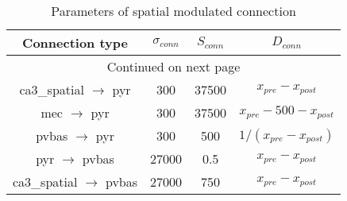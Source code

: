 \begin{longtable}{cccc}
\caption{Parameters of spatial modulated connection}\label{spat_conn}\\
\toprule
Connection type & $\sigma_{conn}$ & $S_{conn}$ & $D_{conn}$ \\
\midrule
\endhead
\midrule
\multicolumn{4}{c}{{Continued on next page}} \\
\midrule
\endfoot

\bottomrule
\endlastfoot
ca3\_spatial $\rightarrow$  pyr  & 300 &    37500 &  $x_{pre} - x_{post}$  \\
mec $\rightarrow$  pyr  &   300 &     37500        &  $x_{pre} - 500 - x_{post}$\\
pvbas $\rightarrow$ pyr &   300 &      500       &  $1/(x_{pre} - x_{post})$\\
pyr $\rightarrow$ pvbas  &   27000   &     0.5 &  $x_{pre} - x_{post}$\\
ca3\_spatial $\rightarrow$ pvbas        &   27000  &      750 &  $x_{pre} - x_{post}$\\
\end{longtable}

